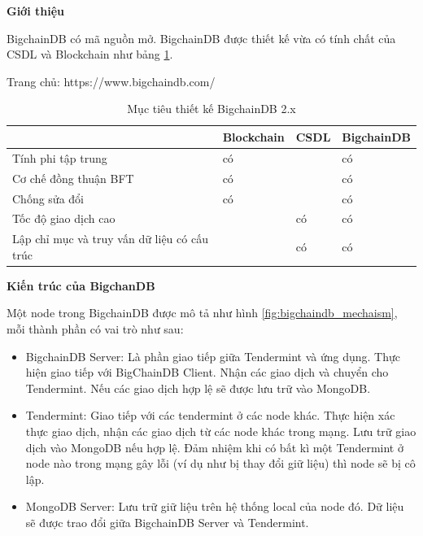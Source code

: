 \textbf{Giới thiệu}

BigchainDB có mã nguồn mở.
BigchainDB được thiết kế vừa có tính chất của CSDL và Blockchain như bảng \ref{table:bigchaindb}.

Trang chủ: https://www.bigchaindb.com/

\begin{table}[H]
\caption{Mục tiêu thiết kế BigchainDB 2.x}
	\label{table:bigchaindb}
	\begin{tabularx} {\textwidth} {|X|p{2.2cm}|p{2.2cm}|p{2.2cm}|}
\hline
	 & Blockchain & CSDL & BigchainDB \\ \hline
	Tính phi tập trung & có &   & có \\ \hline
	Cơ chế đồng thuận BFT   & có  &   & có \\ \hline
	Chống sửa đổi  & có  &   & có \\ \hline
	Tốc độ giao dịch cao &  & có  & có \\ \hline
	Lập chỉ mục và truy vấn dữ liệu có cấu trúc   &   & có & có \\ \hline
\end{tabularx}
\end{table}

\textbf{Kiến trúc của BigchanDB}

Một node trong BigchainDB được mô tả như hình \ref{fig:bigchaindb_mechaism}, mỗi thành phần có vai trò như sau:

\begin{itemize}
	\item BigchainDB Server: Là phần giao tiếp giữa Tendermint và ứng dụng.
Thực hiện giao tiếp với BigChainDB Client.
Nhận các giao dịch và chuyển cho Tendermint.
Nếu các giao dịch hợp lệ sẽ được lưu trữ vào MongoDB.
	\item Tendermint: Giao tiếp với các tendermint ở các node khác.
Thực hiện xác thực giao dịch, nhận các giao dịch từ các node khác trong mạng.
Lưu trữ giao dịch vào MongoDB nếu hợp lệ.
Đảm nhiệm khi có bất kì một Tendermint ở node nào trong mạng gây lỗi (ví dụ như bị thay đổi giữ liệu) thì node sẽ bị cô lập.
	\item MongoDB Server: Lưu trữ giữ liệu trên hệ thống local của node đó. Dữ liệu sẽ được trao đổi giữa BigchainDB Server và Tendermint.
\end{itemize}

